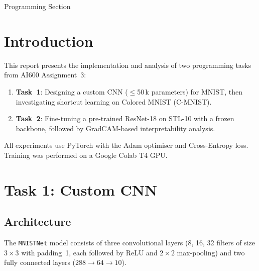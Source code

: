\documentclass[11pt,a4paper]{article}
\begin{document}
\newpage

\vspace*{\fill}
\begin{center}
    \Huge{Programming Section}
\end{center}
\vspace*{\fill}
\newpage
\section{Introduction}

This report presents the implementation and analysis of two programming tasks
from AI600 Assignment~3:
\begin{enumerate}
  \item \textbf{Task~1}: Designing a custom CNN ($\leq$50\,k parameters) for
        MNIST, then investigating shortcut learning on Colored MNIST (C-MNIST).
  \item \textbf{Task~2}: Fine-tuning a pre-trained ResNet-18 on STL-10 with a
        frozen backbone, followed by GradCAM-based interpretability analysis.
\end{enumerate}
All experiments use PyTorch with the Adam optimiser and Cross-Entropy loss.
Training was performed on a Google Colab T4 GPU.

\section{Task 1: Custom CNN}

\subsection{Architecture}

The \texttt{MNISTNet} model consists of three convolutional layers
(8, 16, 32 filters of size $3\times3$ with padding~1, each followed by ReLU
and $2\times2$ max-pooling) and two fully connected layers ($288\to64\to10$).
\end{document}
